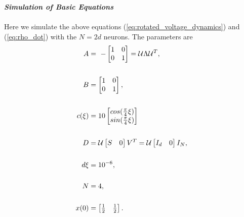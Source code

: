 \textbf{\textit{Simulation of Basic Equations}}\\
\\
Here we simulate the above equations (\ref{eq:rotated_voltage_dynamics}) and (\ref{eq:rho_dot}) with the $N = 2d$ neurons. The parameters are
\begin{align}
\label{eq:sim_I_params}
A
&=
\ -\begin{bmatrix}  
1 & 0 \\
0 & 1
\end{bmatrix} = \mathcal{U} \Lambda \mathcal{U}^T \notag,
\\
\notag
\\
B
&=
\begin{bmatrix}  
1 & 0 \\
0 & 1
\end{bmatrix}, \notag 
\\
\notag 
\\
c(\xi) 
&=
10 \begin{bmatrix} 
cos(\frac{\pi}{4} \xi)\\
sin(\frac{\pi}{4} \xi)
\end{bmatrix} 
\\
\notag
\\
D
&=
\mathcal{U} 
\begin{bmatrix}
S & 0
\end{bmatrix}
V^T
=
\mathcal{U} 
\begin{bmatrix}
I_d & 0
\end{bmatrix}
I_N \notag,
\\
\notag 
\\
d\xi 
&= 
10^{-6}, \notag 
\\
\notag 
\\
N 
&= 
4,\notag 
\\
\notag 
\\
x(0) 
&= 
\begin{bmatrix} \frac{1}{2} & \frac{1}{2} \end{bmatrix}.\notag 
\end{align}

